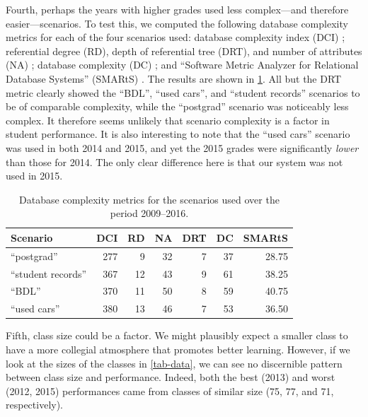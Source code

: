 \documentclass[sigconf, authordraft, capitalise]{acmart}
\begin{document}
Fourth, perhaps the years with higher grades used less complex---and therefore easier---scenarios. To test this, we computed the following database complexity metrics for each of the four scenarios used: database complexity index (DCI) \cite{Sinha.B-2014a-Estimation}; referential degree (RD), depth of referential tree (DRT), and number of attributes (NA) \cite{Calero.C-2001a-Database,Piattini.M-2001a-Table}; database complexity (DC) \cite{Pavlic.M-2008a-Database}; and ``Software Metric Analyzer for Relational Database Systems'' (SMARtS)
\cite{Jamil.B-2010a-SMARtS}. The results are shown in \cref{tab-metrics}. All but the DRT metric clearly showed the ``BDL'', ``used cars'', and ``student records'' scenarios to be of comparable complexity, while the ``postgrad'' scenario was noticeably less complex. It therefore seems unlikely that scenario complexity is a factor in student performance. It is also interesting to note that the ``used cars'' scenario was used in both 2014 and 2015, and yet the 2015 grades were significantly \emph{lower} than those for 2014. The only clear difference here is that our system was not used in 2015.


\begin{table}
    \caption{Database complexity metrics for the scenarios used over the period 2009--2016.}
    \label{tab-metrics}
    \begin{tabular}{lrrrrrr}
        \toprule
            Scenario            &   DCI &   RD  &   NA  &   DRT &   DC  &   SMARtS  \\
            \midrule
            ``postgrad''        &   277 &   9   &   32  &   7   &   37  &   28.75   \\
            ``student records'' &   367 &   12  &   43  &   9   &   61  &   38.25   \\
            ``BDL''             &   370 &   11  &   50  &   8   &   59  &   40.75   \\
            ``used cars''       &   380 &   13  &   46  &   7   &   53  &   36.50    \\
        \bottomrule
    \end{tabular}
\end{table}


Fifth, class size could be a factor. We might plausibly expect a smaller class to have a more collegial atmosphere that promotes better learning. However, if we look at the sizes of the classes in \cref{tab-data}, we can see no discernible pattern between class size and performance. Indeed, both the best (2013) and worst (2012, 2015) performances came from classes of similar size (75, 77, and 71, respectively).
\end{document}
